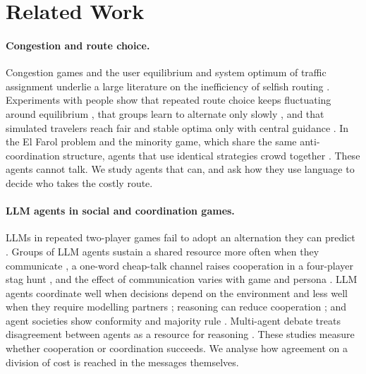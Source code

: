 \documentclass[11pt]{article}
\begin{document}
\section{Related Work}
\label{sec:related}
\paragraph{Congestion and route choice.}
Congestion games \citep{rosenthal1973_congestion} and the user equilibrium and system optimum of traffic assignment \citep{wardrop1952_road} underlie a large literature on the inefficiency of selfish routing \citep{roughgarden2002_selfish_routing}. Experiments with people show that repeated route choice keeps fluctuating around equilibrium \citep{selten2007_commuters}, that groups learn to alternate only slowly \citep{helbing2005_turn_taking}, and that simulated travelers reach fair and stable optima only with central guidance \citep{klein2018_cooperation_atis}. In the El Farol problem and the minority game, which share the same anti-coordination structure, agents that use identical strategies crowd together \citep{arthur1994_inductive,challet1997_minority}. These agents cannot talk. We study agents that can, and ask how they use language to decide who takes the costly route.

\paragraph{LLM agents in social and coordination games.}
LLMs in repeated two-player games fail to adopt an alternation they can predict \citep{akata2025_repeated_games}. Groups of LLM agents sustain a shared resource more often when they communicate \citep{piatti2024_govsim}, a one-word cheap-talk channel raises cooperation in a four-player stag hunt \citep{madmoun2026_communication}, and the effect of communication varies with game and persona \citep{buscemi2026_strategic_communication}. LLM agents coordinate well when decisions depend on the environment and less well when they require modelling partners \citep{agashe2025_llm_coordination}; reasoning can reduce cooperation \citep{li2025_spontaneous_giving}; and agent societies show conformity and majority rule \citep{zhang2024_collaboration}. Multi-agent debate treats disagreement between agents as a resource for reasoning \citep{liang2024_debate}. These studies measure whether cooperation or coordination succeeds. We analyse how agreement on a division of cost is reached in the messages themselves.
\end{document}
